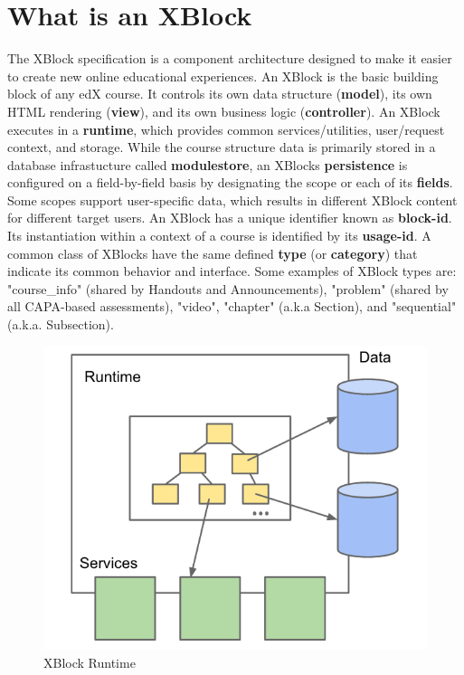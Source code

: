 \section{What is an XBlock}
The XBlock specification is a component architecture designed to make it easier to create new
online educational experiences. An XBlock is the basic building block of any edX course. It
controls its own data structure (\textbf{model}), its own HTML rendering (\textbf{view}), and its own business logic
(\textbf{controller}). An XBlock executes in a \textbf{runtime}, which provides common services/utilities,
user/request context, and storage. While the course structure data is primarily stored in a database
infrastucture called \textbf{modulestore}, an XBlocks \textbf{persistence} is configured on a field-by-field basis
by designating the scope or each of its \textbf{fields}. Some scopes support user-specific data, which results
in different XBlock content for different target users.\newline
An XBlock has a unique identifier known as \textbf{block-id}. Its instantiation within a context of a course
is identified by its \textbf{usage-id}. A common class of XBlocks have the same defined \textbf{type} (or \textbf{category})
that indicate its common behavior and interface. Some examples of XBlock types are:
"course\_info" (shared by Handouts and Announcements), "problem" (shared by all CAPA-based
assessments), "video", "chapter" (a.k.a Section), and "sequential" (a.k.a. Subsection).\newline
\begin{figure}
	\includegraphics[width=\linewidth]{images/xblock_runtime.png}
	\caption{XBlock Runtime}
	\label{Fig.1:Xblock runtime}
\end{figure}

